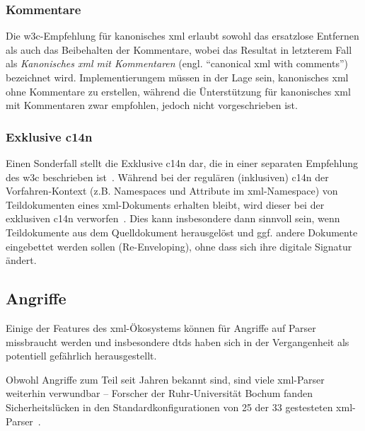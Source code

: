 \subsubsection{Kommentare}
\label{sec:c14ncomments}

Die \gls{w3c}-Empfehlung für kanonisches \acrshort{xml} erlaubt sowohl das ersatzlose Entfernen als auch das Beibehalten der Kommentare, wobei das Resultat in letzterem Fall als \emph{Kanonisches \acrshort{xml} mit Kommentaren} (engl. \enquote{canonical \acrshort{xml} with comments})~\cite[Abschnitt 2.1]{c14n} bezeichnet wird. Implementierungem müssen in der Lage sein, kanonisches \acrshort{xml} ohne Kommentare zu erstellen, während die Ünterstützung für kanonisches \acrshort{xml} mit Kommentaren zwar empfohlen, jedoch nicht vorgeschrieben ist.

\subsubsection{Exklusive \acrlong{c14n}}
\label{sec:excc14n}

Einen Sonderfall stellt die Exklusive \acrlong{c14n} dar, die in einer separaten Empfehlung des \gls{w3c} beschrieben ist~\cite{excc14n}. Während bei der regulären (inklusiven) \acrlong{c14n} der Vorfahren-Kontext (z.B. Namespaces und Attribute im \acrshort{xml}-Namespace) von Teildokumenten eines \acrshort{xml}-Dokuments erhalten bleibt, wird dieser bei der exklusiven \acrshort{c14n} verworfen~\cite[Abschnitt~18]{siddiqui2002c14n2}. Dies kann insbesondere dann sinnvoll sein, wenn Teildokumente aus dem Quelldokument herausgelöst und ggf. andere Dokumente eingebettet werden sollen (Re-Enveloping), ohne dass sich ihre digitale Signatur ändert.

\subsection{Angriffe}
\label{sec:xmlattacks}

Einige der Features des \acrshort{xml}-Ökosystems können für Angriffe auf Parser missbraucht werden und insbesondere \glspl{dtd} haben sich in der Vergangenheit als potentiell gefährlich herausgestellt.~\cite[S.~4]{morgan2014xml}

Obwohl Angriffe zum Teil seit Jahren bekannt sind, sind viele \acrshort{xml}-Parser weiterhin verwundbar -- Forscher der Ruhr-Universität Bochum fanden Sicherheitslücken in den Standardkonfigurationen von 25 der 33 gestesteten \acrshort{xml}-Parser~\cite{spaeth2016sok}.


